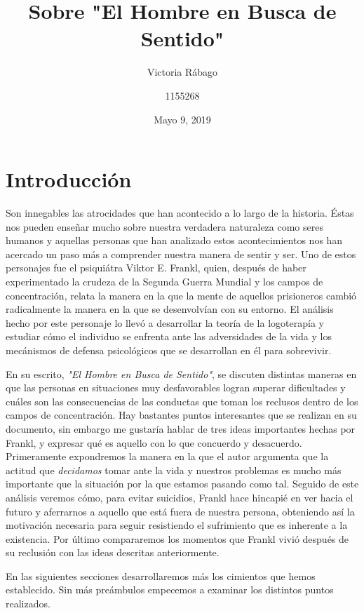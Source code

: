 \documentclass[12pt, letterpaper]{article}
\title{Sobre "El Hombre en Busca de Sentido"}
\author{Victoria Rábago \and 1155268}
\date{Mayo 9, 2019}
\begin{document}
\maketitle
{}
\section*{Introducción}
Son innegables las atrocidades que han acontecido a lo largo de la historia. Éstas nos pueden enseñar mucho sobre nuestra verdadera naturaleza como seres humanos y aquellas personas que han analizado estos acontecimientos nos han acercado un paso más a comprender nuestra manera de sentir y ser. Uno de estos personajes fue el psiquiátra Viktor E. Frankl, quien, después de haber experimentado la crudeza de la Segunda Guerra Mundial y los campos de concentración, relata la manera en la que la mente de aquellos prisioneros cambió radicalmente la manera en la que se desenvolvían con su entorno. El análisis hecho por este personaje lo llevó a desarrollar la teoría de la logoterapía y estudiar cómo el individuo se enfrenta ante las adversidades de la vida y los mecánismos de defensa psicológicos que se desarrollan en él para sobrevivir.

En su escrito, \textit{"El Hombre en Busca de Sentido"}, se discuten distintas maneras en que las personas en situaciones muy desfavorables logran superar dificultades y cuáles son las consecuencias de las conductas que toman los reclusos dentro de los campos de concentración. Hay bastantes puntos interesantes que se realizan en su documento, sin embargo me gustaría hablar de tres ideas importantes hechas por Frankl, y expresar qué es aquello con lo que concuerdo y desacuerdo. Primeramente expondremos la manera en la que el autor argumenta que la actitud que \textit{decidamos} tomar ante la vida y nuestros problemas es mucho más importante que la situación por la que estamos pasando como tal. Seguido de este análisis veremos cómo, para evitar suicidios, Frankl hace hincapié en ver hacia el futuro y aferrarnos a aquello que está fuera de nuestra persona, obteniendo así la motivación necesaria para seguir resistiendo el sufrimiento que es inherente a la existencia. Por último compararemos los momentos que Frankl vivió después de su reclusión con las ideas descritas anteriormente.

En las siguientes secciones desarrollaremos más los cimientos que hemos establecido. Sin más preámbulos empecemos a examinar los distintos puntos realizados.

\newpage
{}
\end{document}
